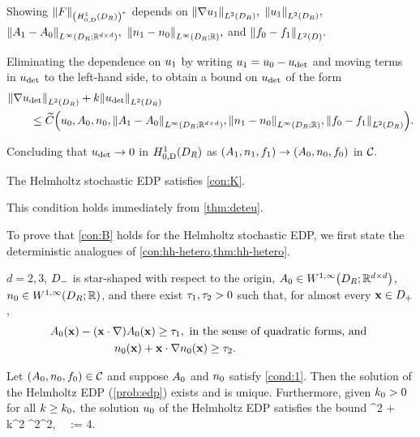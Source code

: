 \item Showing $\NHozDDRas{F}$ depends on $\NLtDR{\grad \uo},$ $\NLtDR{\uo},$ $\NLiDRRRdtd{\Ao-\Az},$ $\NLiDRRR{\no-\nz},$ and $\NLtD{\fz-\fo}.$
\item Eliminating the dependence on $u_{1}$ by writing $u_{1} = u_{0}-u_{\mathrm{det}}$ and moving terms in $u_{\mathrm{det}}$ to the left-hand side, to obtain a bound on $u_{\mathrm{det}}$ of the form
  \begin{align*}
&\NLtDR{\grad \ud} + k\NLtDR{\ud} \\
&\qquad\leq \Ctilde\Big(\uz,\Az,\nz,\NLiDRRRdtd{\Ao-\Az},\NLiDRRR{\no-\nz},\NLtDR{\fz-\fo}\Big).
\end{align*}
\item Concluding that $u_{\mathrm{det}}\rightarrow0$ in $\HozDDR$ as $(A_{1},n_{1},f_{1}) \rightarrow (A_{0},n_{0},f_{0})$ in $\mathcal C.$
\een\epf

\label{lem:hh-K}
The Helmholtz stochastic EDP satisfies \cref{con:K}.
\ele

This condition holds immediately from \cref{thm:deteu}.
\epf

To prove that \cref{con:B} holds for the Helmholtz stochastic EDP, we first state the deterministic analogues of \cref{con:hh-hetero,thm:hh-hetero}.

\label{cond:1}
$d=2,3$, $D_{-}$ is star-shaped with respect to the origin, $\Az\in \WoiDRRRdtd$, $\nz\in \WoiDRRR$, and there exist $\tau_{1}, \tau_{2}>0$ such that,
for almost every $\mathbf{x}\in D_{+}$,
\begin{align}\label{eq:A1}
&\Az(\bx) - (\bx\cdot\nabla)\Az(\bx) \geq \consto, \text{ in the sense of quadratic forms, and }\\
\label{eq:n1}
& \hspace{2cm}\nz(\bx)+ \bx\cdot\nabla \nz(\bx) \geq \constt. %
\end{align}
\econ

\label{thm:eubedp}
Let $(A_{0},n_{0},f_{0}) \in \mathcal C$ and suppose $A_{0}$ and $n_{0}$ satisfy \cref{cond:1}. Then the solution of the Helmholtz EDP (\cref{prob:edp}) exists and is unique. Furthermore, given $k_{0} > 0$ for all $k \geq k_{0},$ the solution $u_{0}$ of the Helmholtz EDP satisfies the bound 
\beq\label{eq:heterobound1}
\consto \NLtDR{\grad \uz}^2 + \constt k^2 \NLtDR{\uz}^2\leq \Co \NLtDR{\fz}^2,\,\,  \,\, \Co := 4.
\eeq
\enth

